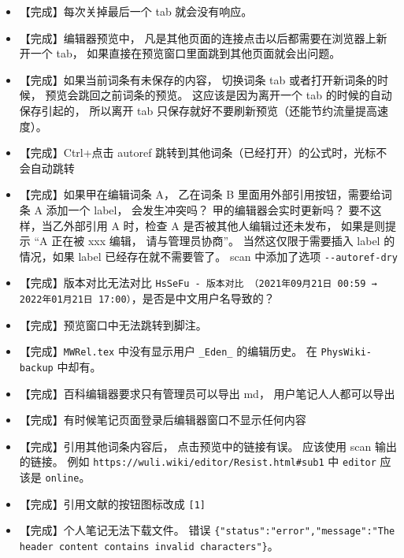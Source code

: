 \begin{itemize}
\item 【完成】每次关掉最后一个 tab 就会没有响应。

\item 【完成】编辑器预览中， 凡是其他页面的连接点击以后都需要在浏览器上新开一个 tab， 如果直接在预览窗口里面跳到其他页面就会出问题。

\item 【完成】如果当前词条有未保存的内容， 切换词条 tab 或者打开新词条的时候， 预览会跳回之前词条的预览。 这应该是因为离开一个 tab 的时候的自动保存引起的， 所以离开 tab 只保存就好不要刷新预览（还能节约流量提高速度）。

\item 【完成】Ctrl+点击 autoref 跳转到其他词条（已经打开）的公式时，光标不会自动跳转

\item 【完成】如果甲在编辑词条 A， 乙在词条 B 里面用外部引用按钮，需要给词条 A 添加一个 label， 会发生冲突吗？ 甲的编辑器会实时更新吗？ 要不这样，当乙外部引用 A 时，检查 A 是否被其他人编辑过还未发布， 如果是则提示 “A 正在被 xxx 编辑， 请与管理员协商”。 当然这仅限于需要插入 label 的情况，如果 label 已经存在就不需要管了。 scan 中添加了选项 \verb|--autoref-dry|

\item 【完成】版本对比无法对比 \verb|HsSeFu - 版本对比 （2021年09月21日 00:59 → 2022年01月21日 17:00）|，是否是中文用户名导致的？

\item 【完成】预览窗口中无法跳转到脚注。

\item 【完成】\verb|MWRel.tex| 中没有显示用户 \verb|_Eden_| 的编辑历史。 在 \verb|PhysWiki-backup| 中却有。

\item 【完成】百科编辑器要求只有管理员可以导出 md， 用户笔记人人都可以导出

\item 【完成】有时候笔记页面登录后编辑器窗口不显示任何内容

\item 【完成】引用其他词条内容后， 点击预览中的链接有误。 应该使用 scan 输出的链接。 例如 \verb|https://wuli.wiki/editor/Resist.html#sub1| 中 \verb|editor| 应该是 \verb|online|。

\item 【完成】引用文献的按钮图标改成 \verb|[1]|

\item 【完成】个人笔记无法下载文件。 错误 \verb|{"status":"error","message":"The header content contains invalid characters"}|。


\end{itemize}
